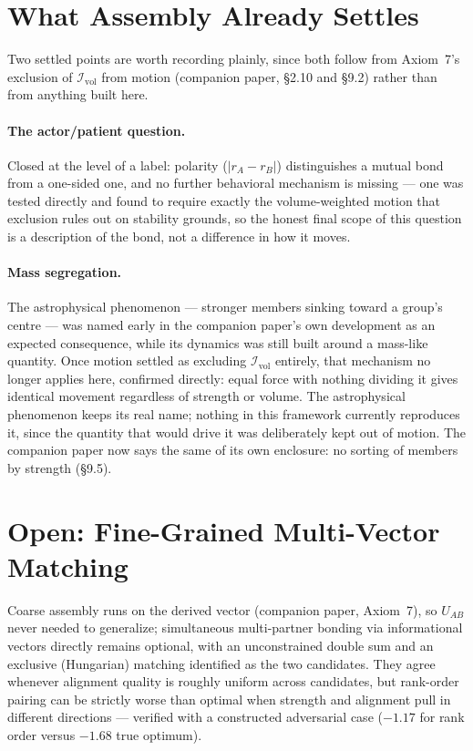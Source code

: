 \documentclass[12pt, a4paper]{article}
\begin{document}
\section{What Assembly Already Settles}
\label{sec:already_settled}

Two settled points are worth recording plainly, since both follow
from Axiom~7's exclusion of $\mathcal{I}_{\mathrm{vol}}$ from motion (companion paper, \S2.10 and \S9.2) rather than from anything built
here.

\paragraph{The actor/patient question.} Closed at the level of a
label: polarity ($\lvert r_A-r_B\rvert$) distinguishes a mutual bond
from a one-sided one, and no further behavioral mechanism is
missing --- one was tested directly and found to require exactly
the volume-weighted motion that exclusion rules out on stability
grounds, so the honest final scope of this question is a
description of the bond, not a difference in how it moves.

\paragraph{Mass segregation.} The astrophysical phenomenon ---
stronger members sinking toward a group's centre --- was named
early in the companion paper's own development as an expected
consequence, while its dynamics was still built around a mass-like
quantity. Once motion settled as excluding $\mathcal{I}_{\mathrm{vol}}$
entirely, that mechanism no longer applies here, confirmed directly:
equal force with nothing dividing it gives identical movement
regardless of strength or volume. The astrophysical phenomenon keeps
its real name; nothing in this framework currently reproduces it,
since the quantity that would drive it was deliberately kept out of motion. The companion paper
now says the same of its own enclosure: no sorting of members by strength (\S9.5).

\section{Open: Fine-Grained Multi-Vector Matching}
\label{sec:open_matching}

Coarse assembly runs on the derived vector (companion paper,
Axiom~7), so $U_{AB}$ never needed to generalize; simultaneous
multi-partner bonding via informational vectors directly remains
optional, with an unconstrained double sum and an exclusive
(Hungarian) matching identified as the two candidates. They agree
whenever alignment quality is roughly uniform across candidates, but
rank-order pairing can be strictly worse than optimal when strength
and alignment pull in different directions --- verified with a
constructed adversarial case ($-1.17$ for rank order versus $-1.68$
true optimum).
\end{document}
